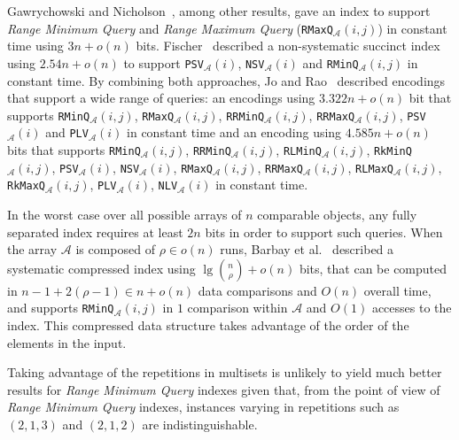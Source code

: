 Gawrychowski and
Nicholson~\cite{2015-ICALP-OptimalEncodingsForRangeTopKSelectionAndMinMax-GawrychowskiNicholson},
among other results, gave an index to support \emph{Range Minimum
  Query} and \emph{Range Maximum Query}
(\texttt{RMaxQ}$_{\mathcal{A}}(i,j)$) in constant time using
$3n + o(n)$ bits.
Fischer~\cite{2011-TCS-CombinedDataStructureForPreviousAndNextSmallerValues-Fischer}
described a non-systematic succinct index using $2.54n + o(n)$ to
support \texttt{PSV}$_{\mathcal{A}}(i)$,
\texttt{NSV}$_{\mathcal{A}}(i)$ and
\texttt{RMinQ}$_{\mathcal{A}}(i,j)$ in constant time. By combining both approaches, Jo
and
Rao~\cite{2015-COCOON-SimultaneousEncodingsForRangeAndNextPreviousLargerSmallerValueQueries-JoRao}
described encodings that support a wide range of queries: an encodings
using $3.322n + o(n)$ bit that supports
\texttt{RMinQ}$_{\mathcal{A}}(i,j)$,
\texttt{RMaxQ}$_{\mathcal{A}}(i,j)$,
\texttt{RRMinQ}$_{\mathcal{A}}(i,j)$,
\texttt{RRMaxQ}$_{\mathcal{A}}(i,j)$, \texttt{PSV}$_{\mathcal{A}}(i)$
and \texttt{PLV}$_{\mathcal{A}}(i)$ in constant time and an encoding
using $4.585n + o(n)$ bits that supports
\texttt{RMinQ}$_{\mathcal{A}}(i,j)$,
\texttt{RRMinQ}$_{\mathcal{A}}(i,j)$,
\texttt{RLMinQ}$_{\mathcal{A}}(i,j)$,
\texttt{RkMinQ}$_{\mathcal{A}}(i,j)$, \texttt{PSV}$_{\mathcal{A}}(i)$,
\texttt{NSV}$_{\mathcal{A}}(i)$, \texttt{RMaxQ}$_{\mathcal{A}}(i,j)$,
\texttt{RRMaxQ}$_{\mathcal{A}}(i,j)$,
\texttt{RLMaxQ}$_{\mathcal{A}}(i,j)$,
\texttt{RkMaxQ}$_{\mathcal{A}}(i,j)$, \texttt{PLV}$_{\mathcal{A}}(i)$,
\texttt{NLV}$_{\mathcal{A}}(i)$ in constant time.

In the worst case over all
possible arrays of $n$ comparable objects, any fully separated index
requires at least $2n$ bits in order to support such queries.
% 
When the array ${\mathcal{A}}$ is composed of $\rho \in o(n)$ runs,
Barbay et
al.~\cite{2012-TCS-LRMTreesCompressedIndicesAdaptiveSortingAndCompressedPermutations-BarbayFischerNavarro}
described a systematic compressed index using
$\lg{n\choose \rho} + o(n)$ bits, that can be computed in
$n-1+2(\rho-1) \in n+o(n)$ data comparisons and $O(n)$ overall time,
and supports \texttt{RMinQ}$_{\mathcal{A}}(i,j)$ in $1$ comparison
within ${\mathcal{A}}$ and $O(1)$ accesses to the index. This
compressed data structure takes advantage of the order of the elements
in the input.

Taking advantage of the repetitions in multisets is unlikely to yield
much better results for \emph{Range Minimum Query} indexes given that,
from the point of view of \emph{Range Minimum Query} indexes,
instances varying in repetitions such as $(2,1,3)$ and $(2, 1, 2)$ are
indistinguishable.

